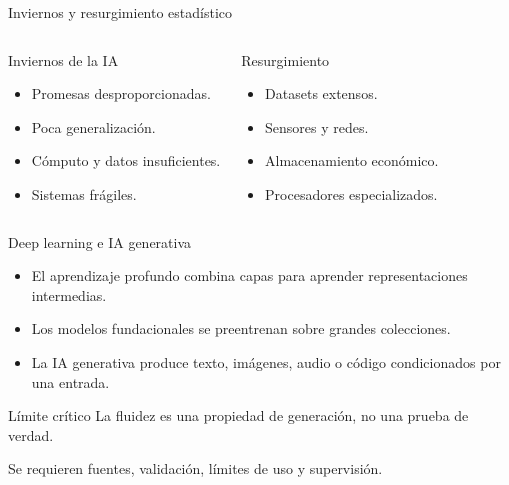\documentclass[aspectratio=169,11pt]{beamer}
\begin{document}
\begin{frame}{Inviernos y resurgimiento estadístico}
  \begin{columns}[T]
      \begin{block}{Inviernos de la IA}
        \begin{itemize}
          \item Promesas desproporcionadas.
          \item Poca generalización.
          \item Cómputo y datos insuficientes.
          \item Sistemas frágiles.
        \end{itemize}
      \end{block}
      \begin{block}{Resurgimiento}
        \begin{itemize}
          \item Datasets extensos.
          \item Sensores y redes.
          \item Almacenamiento económico.
          \item Procesadores especializados.
        \end{itemize}
      \end{block}
  \end{columns}
\end{frame}

\begin{frame}{Deep learning e IA generativa}
  \begin{itemize}
    \item El aprendizaje profundo combina capas para aprender representaciones intermedias.
    \item Los modelos fundacionales se preentrenan sobre grandes colecciones.
    \item La IA generativa produce texto, imágenes, audio o código condicionados por una entrada.
  \end{itemize}
  \vspace{0.5em}
  \begin{alertblock}{Límite crítico}
    La fluidez es una propiedad de generación, no una prueba de verdad.
  \end{alertblock}
  Se requieren fuentes, validación, límites de uso y supervisión.
\end{frame}
\end{document}

